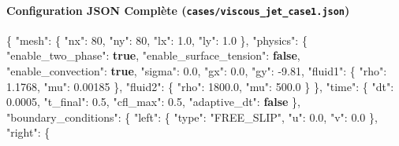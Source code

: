 \documentclass[
  10pt,
]{article}
\newenvironment{Shaded}{}{}
\newcommand{\DataTypeTok}[1]{\textcolor[rgb]{0.56,0.13,0.00}{#1}}
\newcommand{\DecValTok}[1]{\textcolor[rgb]{0.25,0.63,0.44}{#1}}
\newcommand{\FloatTok}[1]{\textcolor[rgb]{0.25,0.63,0.44}{#1}}
\newcommand{\FunctionTok}[1]{\textcolor[rgb]{0.02,0.16,0.49}{#1}}
\newcommand{\KeywordTok}[1]{\textcolor[rgb]{0.00,0.44,0.13}{\textbf{#1}}}
\newcommand{\StringTok}[1]{\textcolor[rgb]{0.25,0.44,0.63}{#1}}
\begin{document}
\paragraph{\texorpdfstring{Configuration JSON Complète
(\texttt{cases/viscous\_jet\_case1.json})}{Configuration JSON Complète (cases/viscous\_jet\_case1.json)}}\label{configuration-json-compluxe8te-casesviscous_jet_case1.json}

\begin{Shaded}
\begin{Highlighting}[]
\FunctionTok{\{}
  \DataTypeTok{"mesh"}\FunctionTok{:} \FunctionTok{\{}
    \DataTypeTok{"nx"}\FunctionTok{:} \DecValTok{80}\FunctionTok{,}
    \DataTypeTok{"ny"}\FunctionTok{:} \DecValTok{80}\FunctionTok{,}
    \DataTypeTok{"lx"}\FunctionTok{:} \FloatTok{1.0}\FunctionTok{,}
    \DataTypeTok{"ly"}\FunctionTok{:} \FloatTok{1.0}
  \FunctionTok{\},}
  \DataTypeTok{"physics"}\FunctionTok{:} \FunctionTok{\{}
    \DataTypeTok{"enable\_two\_phase"}\FunctionTok{:} \KeywordTok{true}\FunctionTok{,}
    \DataTypeTok{"enable\_surface\_tension"}\FunctionTok{:} \KeywordTok{false}\FunctionTok{,}
    \DataTypeTok{"enable\_convection"}\FunctionTok{:} \KeywordTok{true}\FunctionTok{,}
    \DataTypeTok{"sigma"}\FunctionTok{:} \FloatTok{0.0}\FunctionTok{,}
    \DataTypeTok{"gx"}\FunctionTok{:} \FloatTok{0.0}\FunctionTok{,}
    \DataTypeTok{"gy"}\FunctionTok{:} \FloatTok{{-}9.81}\FunctionTok{,}
    \DataTypeTok{"fluid1"}\FunctionTok{:} \FunctionTok{\{}
      \DataTypeTok{"rho"}\FunctionTok{:} \FloatTok{1.1768}\FunctionTok{,}
      \DataTypeTok{"mu"}\FunctionTok{:} \FloatTok{0.00185}
    \FunctionTok{\},}
    \DataTypeTok{"fluid2"}\FunctionTok{:} \FunctionTok{\{}
      \DataTypeTok{"rho"}\FunctionTok{:} \FloatTok{1800.0}\FunctionTok{,}
      \DataTypeTok{"mu"}\FunctionTok{:} \FloatTok{500.0}
    \FunctionTok{\}}
  \FunctionTok{\},}
  \DataTypeTok{"time"}\FunctionTok{:} \FunctionTok{\{}
    \DataTypeTok{"dt"}\FunctionTok{:} \FloatTok{0.0005}\FunctionTok{,}
    \DataTypeTok{"t\_final"}\FunctionTok{:} \FloatTok{0.5}\FunctionTok{,}
    \DataTypeTok{"cfl\_max"}\FunctionTok{:} \FloatTok{0.5}\FunctionTok{,}
    \DataTypeTok{"adaptive\_dt"}\FunctionTok{:} \KeywordTok{false}
  \FunctionTok{\},}
  \DataTypeTok{"boundary\_conditions"}\FunctionTok{:} \FunctionTok{\{}
    \DataTypeTok{"left"}\FunctionTok{:} \FunctionTok{\{}
      \DataTypeTok{"type"}\FunctionTok{:} \StringTok{"FREE\_SLIP"}\FunctionTok{,}
      \DataTypeTok{"u"}\FunctionTok{:} \FloatTok{0.0}\FunctionTok{,}
      \DataTypeTok{"v"}\FunctionTok{:} \FloatTok{0.0}
    \FunctionTok{\},}
    \DataTypeTok{"right"}\FunctionTok{:} \FunctionTok{\{}

\end{Highlighting}
\end{Shaded}
\end{document}
